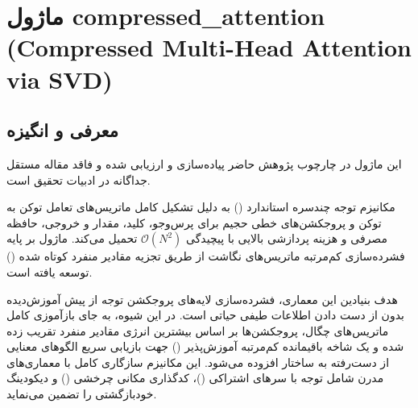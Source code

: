 \section{ماژول compressed\_attention (Compressed Multi-Head Attention via SVD)}
\label{sec:module_compressed_attention}

\subsection{معرفی و انگیزه}
این ماژول در چارچوب پژوهش حاضر پیاده‌سازی و ارزیابی شده و فاقد مقاله مستقل جداگانه در ادبیات تحقیق است.

مکانیزم توجه چندسره استاندارد () به دلیل تشکیل کامل ماتریس‌های تعامل توکن به توکن و پروجکشن‌های خطی حجیم برای پرس‌وجو، کلید، مقدار و خروجی، حافظه مصرفی و هزینه پردازشی بالایی با پیچیدگی $\mathcal{O}(N^2)$ تحمیل می‌کند. ماژول  بر پایه فشرده‌سازی کم‌مرتبه ماتریس‌های نگاشت از طریق تجزیه مقادیر منفرد کوتاه شده () توسعه یافته است.

هدف بنیادین این معماری، فشرده‌سازی لایه‌های پروجکشن توجه از پیش آموزش‌دیده بدون از دست دادن اطلاعات طیفی حیاتی است. در این شیوه، به جای بازآموزی کامل ماتریس‌های چگال، پروجکشن‌ها بر اساس بیشترین انرژی مقادیر منفرد تقریب زده شده و یک شاخه باقیمانده کم‌مرتبه آموزش‌پذیر () جهت بازیابی سریع الگوهای معنایی از دست‌رفته به ساختار افزوده می‌شود. این مکانیزم سازگاری کامل با معماری‌های مدرن شامل توجه با سرهای اشتراکی ()، کدگذاری مکانی چرخشی () و دیکودینگ خودبازگشتی را تضمین می‌نماید.

